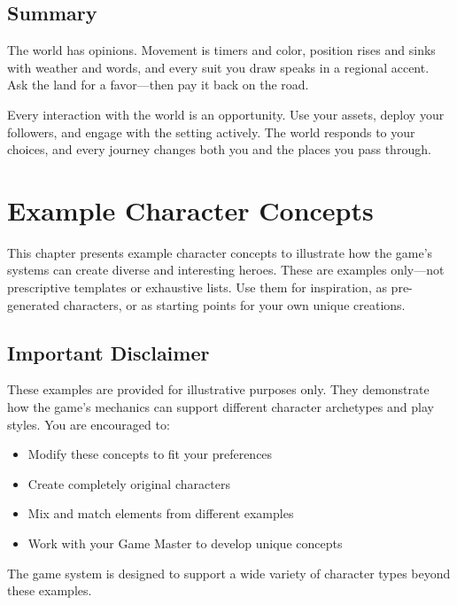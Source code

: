 \documentclass[11pt,twoside,openany]{book}
\begin{document}
\section*{Summary} 

The world has opinions. Movement is timers and color, position rises and sinks with weather and words, and every suit you draw speaks in a regional accent. Ask the land for a favor---then pay it back on the road.

\begin{tcolorbox}[colback=gray!5!white, colframe=gray!75!black, title=Remember, fonttitle=\bfseries,breakable]
Every interaction with the world is an opportunity. Use your assets, deploy your followers, and engage with the setting actively. The world responds to your choices, and every journey changes both you and the places you pass through.
\end{tcolorbox}

\chapter{Example Character Concepts} \label{ch:examples}

This chapter presents example character concepts to illustrate how the game's systems can create diverse and interesting heroes. These are examples only---not prescriptive templates or exhaustive lists. Use them for inspiration, as pre-generated characters, or as starting points for your own unique creations.

\section*{Important Disclaimer} 

These examples are provided for illustrative purposes only. They demonstrate how the game's mechanics can support different character archetypes and play styles. You are encouraged to:
\begin{itemize}
\item Modify these concepts to fit your preferences
\item Create completely original characters
\item Mix and match elements from different examples
\item Work with your Game Master to develop unique concepts
\end{itemize}

The game system is designed to support a wide variety of character types beyond these examples.
\end{document}
